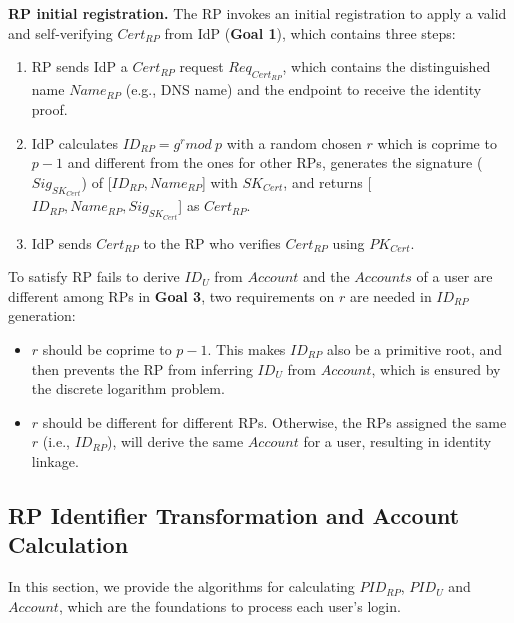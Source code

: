 \vspace{1mm}\noindent\textbf{RP initial registration.}
The RP invokes an initial registration to apply a valid and self-verifying $Cert_{RP}$ from IdP (\textbf{Goal 1}),
 which contains three steps:

\begin{enumerate}
\item RP sends IdP a $Cert_{RP}$ request $Req_{Cert_{RP}}$, which contains the distinguished name $Name_{RP}$ (e.g., DNS name) and the endpoint to receive the identity proof.
\item IdP calculates $ID_{RP} = g^r mod \ p$ with a random chosen $r$ which is coprime to $p-1$ and different from the ones for other RPs,  generates the signature ($Sig_{SK_{Cert}}$) of [$ID_{RP}, Name_{RP}$] with $SK_{Cert}$, and returns [$ID_{RP}, Name_{RP}, Sig_{SK_{Cert}}$] as $Cert_{RP}$.
\item IdP sends $Cert_{RP}$ to the RP who verifies $Cert_{RP}$ using $PK_{Cert}$.
\end{enumerate}



To satisfy RP fails to derive $ID_U$ from $Account$ and the $Accounts$ of a user are different among RPs in \textbf{Goal 3}, two requirements on $r$ are needed  in $ID_{RP}$ generation:
\begin{itemize}
  \item $r$ should be coprime to $p-1$. This makes $ID_{RP}$ also be  a primitive root, and then prevents the RP from inferring $ID_U$ from $Account$, which is  ensured by the discrete logarithm problem.

  \item  $r$ should be different for different RPs. Otherwise, the RPs assigned the same $r$ (i.e., $ID_{RP}$), will derive the same $Account$ for a user, resulting in identity linkage. %
\end{itemize}





\subsection{RP Identifier Transformation and Account Calculation}
\label{subsec:identifier-generation}
In this section, we provide the algorithms for  calculating  $PID_{RP}$, $PID_U$ and $Account$,
which are the foundations to process each user's login. %

